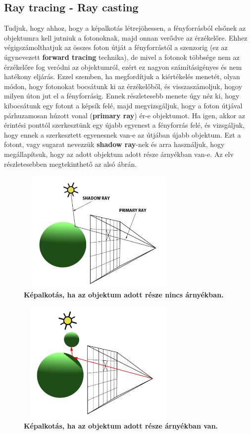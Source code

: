 \documentclass[12pt]{article}
\theoremstyle{plain}
\begin{document}
 \subsection{Ray tracing - Ray casting}
 
 Tudjuk, hogy ahhoz, hogy a képalkotás létrejöhessen, a fényforrásból elsőnek az objektumra kell jutniuk a fotonoknak, majd onnan verődve az érzékelőre. Ehhez végigszámolthatjuk az összes foton útját a fényforrástól a szenzorig (ez az úgynevezett \textbf{forward tracing} technika), de mivel a fotonok többsége nem az érzékelőre fog veródni az objektumról, ezért ez nagyon számításigényes és nem hatékony eljárás. Ezzel szemben, ha megfordítjuk a kiértékelés menetét, olyan módon, hogy fotonokat bocsátunk ki az érzékelőből, és visszaszámoljuk, hogoy milyen úton jut el a fényforrásig. Ennek részletesebb menete úgy néz ki, hogy kibocsátunk egy fotont a képsík felé, majd megvizsgáljuk, hogy a foton útjával párhuzamosan húzott vonal (\textbf{primary ray}) ér-e objektumot. Ha igen, akkor az érintési ponttól szerkesztünk egy újabb egyenest a fényforrás felé, és vizsgáljuk, hogy ennek a szerkesztett egyenesnek van-e az útjában újabb objektum. Ezt a fotont, vagy sugarat nevezzük \textbf{shadow ray}-nek és arra használjuk, hogy megállapítsuk, hogy az adott objektum adott része árnyékban van-e. Az elv részletesebben megtekinthető az alsó ábrán.
 
 \begin{figure}[H]
    \centering
    \includegraphics[width=8cm, height=6cm]{media/shadow1.PNG}
    \caption{\textbf{Képalkotás, ha az objektum adott része nincs árnyékban.}}
    \label{fig:GeneralDiagram}
 \end{figure}
 
 \begin{figure}[H]
    \centering
    \includegraphics[width=8cm, height=6cm]{media/shadow2.PNG}
    \caption{\textbf{Képalkotás, ha az objektum adott része árnyékban van.}}
    \label{fig:GeneralDiagram}
 \end{figure}
 
\end{document}
